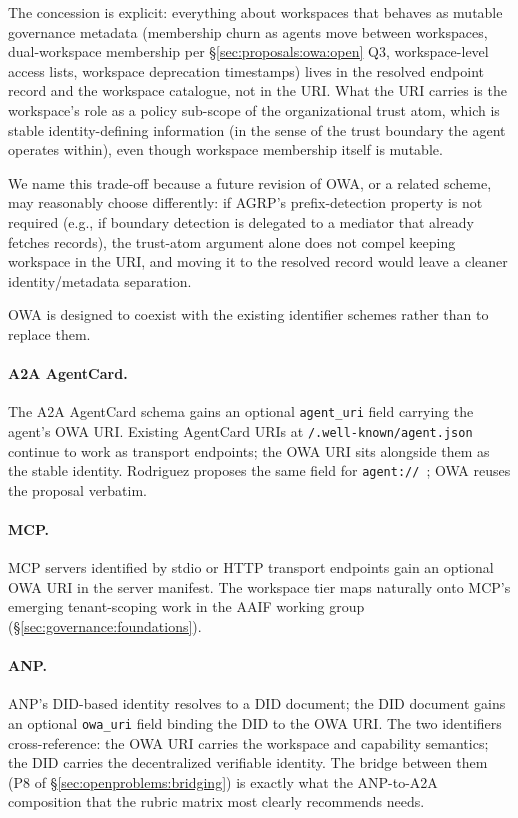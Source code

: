 The concession is explicit: everything about workspaces
that behaves as mutable governance metadata (membership
churn as agents move between workspaces, dual-workspace
membership per \S\ref{sec:proposals:owa:open} Q3,
workspace-level access lists, workspace deprecation
timestamps) lives in the resolved endpoint record and the
workspace catalogue, not in the URI. What the URI carries
is the workspace's role as a policy sub-scope of the
organizational trust atom, which is stable identity-defining
information (in the sense of the trust boundary the agent
operates within), even though workspace membership itself
is mutable.

We name this trade-off because a future revision of OWA,
or a related scheme, may reasonably choose differently:
if AGRP's prefix-detection property is not required
(e.g., if boundary detection is delegated to a mediator
that already fetches records), the trust-atom argument
alone does not compel keeping workspace in the URI, and
moving it to the resolved record would leave a cleaner
identity/metadata separation.

OWA is designed to coexist with the existing identifier
schemes rather than to replace them.

\paragraph{A2A AgentCard.}
The A2A AgentCard schema gains an optional
\texttt{agent\_uri} field carrying the agent's OWA URI.
Existing AgentCard URIs at \texttt{/.well-known/agent.json}
continue to work as transport endpoints; the OWA URI
sits alongside them as the stable identity. Rodriguez
proposes the same field for
\texttt{agent://}~\cite{agent_uri_scheme}; OWA reuses the
proposal verbatim.

\paragraph{MCP.}
MCP servers identified by stdio or HTTP transport endpoints
gain an optional OWA URI in the server manifest. The
workspace tier maps naturally onto MCP's emerging
tenant-scoping work in the AAIF working group
(\S\ref{sec:governance:foundations}).

\paragraph{ANP.}
ANP's DID-based identity resolves to a DID document;
the DID document gains an optional \texttt{owa\_uri} field
binding the DID to the OWA URI. The two identifiers
cross-reference: the OWA URI carries the workspace and
capability semantics; the DID carries the decentralized
verifiable identity. The bridge between them
(P8 of \S\ref{sec:openproblems:bridging}) is exactly what
the ANP-to-A2A composition that the rubric matrix most
clearly recommends needs.

